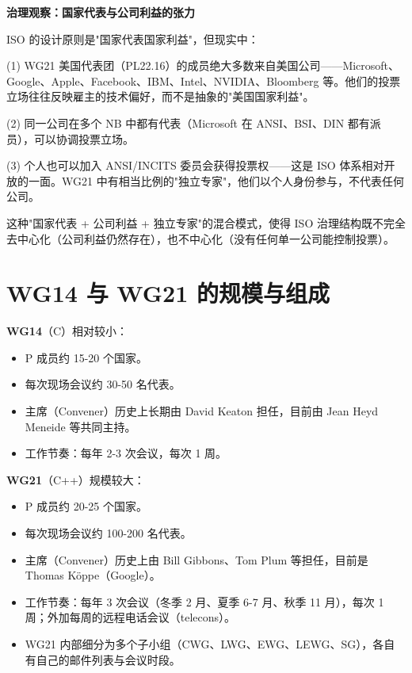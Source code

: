 \documentclass[12pt,a4paper,fontset=fandol]{ctexbook}
\begin{document}
\begin{govbox}
\textbf{治理观察：国家代表与公司利益的张力}

ISO 的设计原则是"国家代表国家利益"，但现实中：

(1) WG21 美国代表团（PL22.16）的成员绝大多数来自美国公司——Microsoft、Google、Apple、Facebook、IBM、Intel、NVIDIA、Bloomberg 等。他们的投票立场往往反映雇主的技术偏好，而不是抽象的"美国国家利益"。

(2) 同一公司在多个 NB 中都有代表（Microsoft 在 ANSI、BSI、DIN 都有派员），可以协调投票立场。

(3) 个人也可以加入 ANSI/INCITS 委员会获得投票权——这是 ISO 体系相对开放的一面。WG21 中有相当比例的"独立专家"，他们以个人身份参与，不代表任何公司。

这种"国家代表 + 公司利益 + 独立专家"的混合模式，使得 ISO 治理结构既不完全去中心化（公司利益仍然存在），也不中心化（没有任何单一公司能控制投票）。
\end{govbox}

\section{WG14 与 WG21 的规模与组成}

\textbf{WG14}（C）相对较小：

\begin{itemize}
  \item P 成员约 15-20 个国家。
  \item 每次现场会议约 30-50 名代表。
  \item 主席（Convener）历史上长期由 David Keaton 担任，目前由 Jean Heyd Meneide 等共同主持。
  \item 工作节奏：每年 2-3 次会议，每次 1 周。
\end{itemize}

\textbf{WG21}（C++）规模较大：

\begin{itemize}
  \item P 成员约 20-25 个国家。
  \item 每次现场会议约 100-200 名代表。
  \item 主席（Convener）历史上由 Bill Gibbons、Tom Plum 等担任，目前是 Thomas Köppe（Google）。
  \item 工作节奏：每年 3 次会议（冬季 2 月、夏季 6-7 月、秋季 11 月），每次 1 周；外加每周的远程电话会议（telecons）。
  \item WG21 内部细分为多个子小组（CWG、LWG、EWG、LEWG、SG），各自有自己的邮件列表与会议时段。
\end{itemize}
\end{document}

